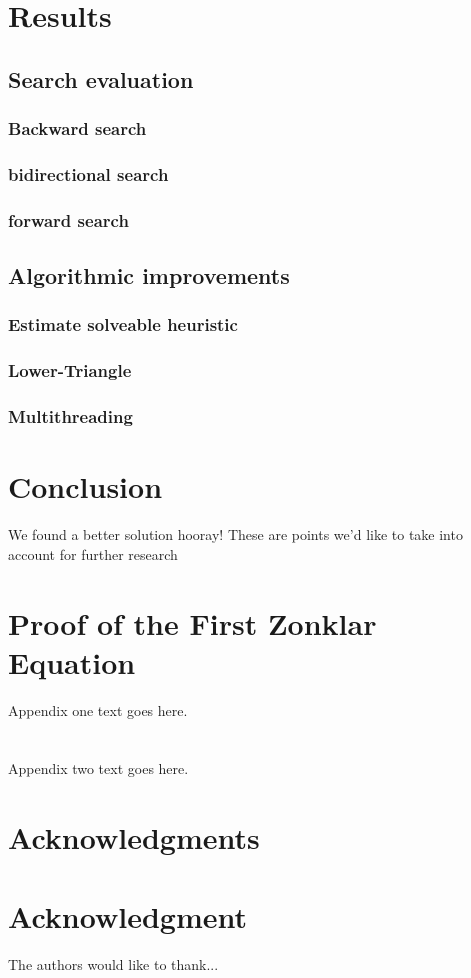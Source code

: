 \documentclass[10pt,journal,compsoc]{IEEEtran}
\begin{document}
\section{Results}
\subsection{Search evaluation}
\subsubsection{Backward search}
\subsubsection{bidirectional search}
\subsubsection{forward search}

\subsection{Algorithmic improvements}
\subsubsection{Estimate solveable heuristic}
\subsubsection{Lower-Triangle}
\subsubsection{Multithreading}

\section{Conclusion}
We found a better solution hooray!
These are points we'd like to take into account for further research


\appendices
\section{Proof of the First Zonklar Equation}
Appendix one text goes here.
\section{}
Appendix two text goes here.


\ifCLASSOPTIONcompsoc
  \section*{Acknowledgments}
\else
  \section*{Acknowledgment}
\fi


The authors would like to thank...

\ifCLASSOPTIONcaptionsoff
  \newpage
\fi




\end{document}
